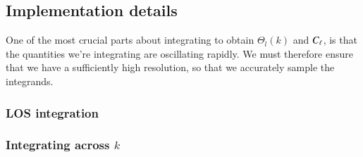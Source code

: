 \subsection{Implementation details}\label{ssec:M4:implementations} 
One of the most crucial parts about integrating to obtain $\Theta_l(k)$ and $C_\ell$, is that the quantities we're integrating are oscillating rapidly. We must therefore ensure that we have a sufficiently high resolution, so that we accurately sample the integrands. 

\subsubsection{LOS integration} \label{sssec:M4:implementations:LOS_integration}


\subsubsection{Integrating across $k$} \label{sssec:M4:implementations:integrating_across_k}